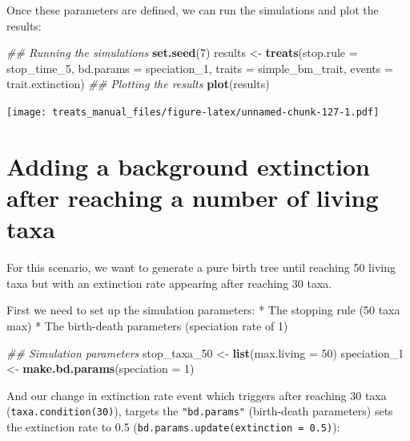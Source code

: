 \documentclass[
]{book}
\newenvironment{Shaded}{\begin{snugshade}}{\end{snugshade}}
\newcommand{\CommentTok}[1]{\textcolor[rgb]{0.56,0.35,0.01}{\textit{#1}}}
\newcommand{\DataTypeTok}[1]{\textcolor[rgb]{0.13,0.29,0.53}{#1}}
\newcommand{\DecValTok}[1]{\textcolor[rgb]{0.00,0.00,0.81}{#1}}
\newcommand{\KeywordTok}[1]{\textcolor[rgb]{0.13,0.29,0.53}{\textbf{#1}}}
\newcommand{\NormalTok}[1]{#1}
\newcommand{\StringTok}[1]{\textcolor[rgb]{0.31,0.60,0.02}{#1}}
\begin{document}
Once these parameters are defined, we can run the simulations and plot the results:

\begin{Shaded}
\begin{Highlighting}[]
\CommentTok{\#\# Running the simulations}
\KeywordTok{set.seed}\NormalTok{(}\DecValTok{7}\NormalTok{)}
\NormalTok{results \textless{}{-}}\StringTok{ }\KeywordTok{treats}\NormalTok{(}\DataTypeTok{stop.rule =}\NormalTok{ stop\_time\_}\DecValTok{5}\NormalTok{,}
                \DataTypeTok{bd.params =}\NormalTok{ speciation\_}\DecValTok{1}\NormalTok{,}
                \DataTypeTok{traits    =}\NormalTok{ simple\_bm\_trait,}
                \DataTypeTok{events    =}\NormalTok{ trait.extinction)}
\CommentTok{\#\# Plotting the results}
\KeywordTok{plot}\NormalTok{(results)}
\end{Highlighting}
\end{Shaded}

\texttt{[image: treats\_manual\_files/figure-latex/unnamed-chunk-127-1.pdf]}

\hypertarget{EGbg_ext}{%
\section{Adding a background extinction after reaching a number of living taxa}\label{EGbg_ext}}

For this scenario, we want to generate a pure birth tree until reaching 50 living taxa but with an extinction rate appearing after reaching 30 taxa.

First we need to set up the simulation parameters:
* The stopping rule (50 taxa max)
* The birth-death parameters (speciation rate of 1)

\begin{Shaded}
\begin{Highlighting}[]
\CommentTok{\#\# Simulation parameters}
\NormalTok{stop\_taxa\_}\DecValTok{50}\NormalTok{ \textless{}{-}}\StringTok{ }\KeywordTok{list}\NormalTok{(}\DataTypeTok{max.living =} \DecValTok{50}\NormalTok{)}
\NormalTok{speciation\_}\DecValTok{1}\NormalTok{ \textless{}{-}}\StringTok{ }\KeywordTok{make.bd.params}\NormalTok{(}\DataTypeTok{speciation =} \DecValTok{1}\NormalTok{)}
\end{Highlighting}
\end{Shaded}

And our change in extinction rate event which triggers after reaching 30 taxa (\texttt{taxa.condition(30)}), targets the \texttt{"bd.params"} (birth-death parameters) sets the extinction rate to 0.5 (\texttt{bd.params.update(extinction\ =\ 0.5)}):
\end{document}
